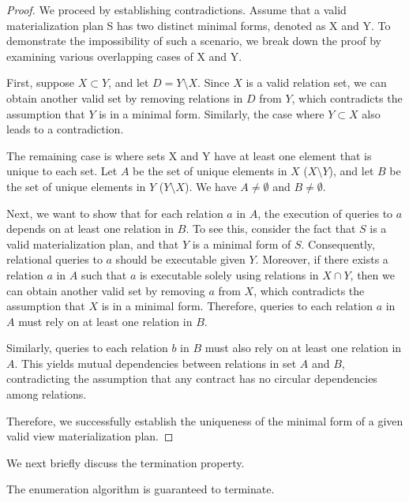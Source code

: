 \begin{proof}
    We proceed by establishing contradictions. 
    Assume that a valid materialization plan S has two distinct minimal forms, denoted as X and Y. 
    To demonstrate the impossibility of such a scenario, we break down the proof by examining various overlapping cases of X and Y.

    First, suppose $X \subset Y$, and let $D=Y \setminus X$. 
    Since $X$ is a valid relation set, we can obtain another valid set by removing relations in $D$ from $Y$, which contradicts the assumption that $Y$ is in a minimal form.
    Similarly, the case where $Y \subset X$ also leads to a contradiction.

    The remaining case is where sets X and Y have at least one element that is unique to each set.
    Let $A$ be the set of unique elements in $X$ ($X \setminus Y$), and let $B$ be the set of unique elements in $Y$ ($ Y \setminus X$). We have $A \neq \emptyset$ and $B \neq \emptyset$.

    Next, we want to show that for each relation $a$ in $A$, 
    the execution of queries to $a$ depends on at least one relation in $B$.
    To see this, consider the fact that $S$ is a valid materialization plan,
    and that $Y$ is a minimal form of $S$.
    Consequently, relational queries to $a$ should be executable given $Y$.
    Moreover, if there exists a relation $a$ in $A$ such that $a$ is executable solely 
    using relations in $X \cap Y$, then we can obtain another valid set by removing $a$ from $X$,
    which contradicts the assumption that $X$ is in a minimal form.
    Therefore, queries to each relation $a$ in $A$ must rely on at least one relation in $B$.
    
    Similarly, queries to each relation $b$ in $B$ must also rely on at least one relation in $A$.
    This yields mutual dependencies between relations in set $A$ and $B$, contradicting the assumption that any contract has no circular dependencies
    among relations.

    Therefore, we successfully establish the uniqueness of the minimal form of a given valid
    view materialization plan.
\end{proof}

\medskip{} We next briefly discuss the termination property.

\begin{lmm}\label{lemma:uniqness}
    The enumeration algorithm is guaranteed to terminate.
\end{lmm}

